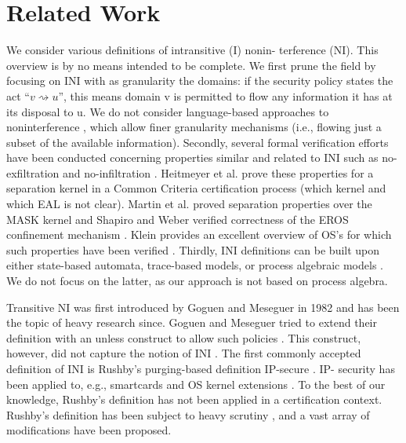 \documentclass[11pt,a4paper]{article}
\begin{document}
\section{Related Work}
We consider various definitions of intransitive (I) nonin- terference (NI). 
This overview is by no means intended to be complete. We first prune the field 
by focusing on INI with as granularity the domains: if the security policy states 
the act ``$v \rightsquigarrow u$'', this means domain v is permitted to flow any information it has 
at its disposal to u. We do not consider language-based approaches to noninterference
\cite{SKIPaper6}, which allow finer granularity mechanisms (i.e., flowing just a subset of 
the available information). Secondly, several formal verification efforts have 
been conducted concerning properties similar and related to INI such as 
no-exfiltration and no-infiltration \cite{SKIPaper7}. Heitmeyer et al. prove these properties 
for a separation kernel in a Common Criteria certification process \cite{Heitmeyer:2006:FSV:1180405.1180448} 
(which kernel and which EAL is not clear). Martin et al. proved separation 
properties over the MASK kernel \cite{Martin:2000:FCM:786768.786973} and Shapiro and Weber verified correctness 
of the EROS confinement mechanism \cite{Shapiro:2000:VEC:882494.884422}. Klein provides an excellent overview of 
OS’s for which such properties have been verified \cite{SKIPaper11}. Thirdly, INI definitions 
can be built upon either state-based automata, trace-based models, or process 
algebraic models \cite{SKIPaper12}. We do not focus on the latter, as our approach is not 
based on process algebra.

Transitive NI was first introduced by Goguen and Meseguer in 1982 \cite{SKIPaper13} and has 
been the topic of heavy research since. Goguen and Meseguer tried to 
extend their definition with an unless construct to allow such policies \cite{SKIPaper14}. 
This construct, however, did not capture the notion of INI \cite{SKIPaper15}. The first 
commonly accepted definition of INI is Rushby’s purging-based definition 
IP-secure \cite{rushby92}. IP- security has been applied to, e.g., smartcards \cite{SKIPaper16} and OS 
kernel extensions \cite{SKIPaper17}. To the best of our knowledge, Rushby’s definition has 
not been applied in a certification context. Rushby’s definition has been 
subject to heavy scrutiny \cite{SKIPaper18}, \cite{VanDerMeyden:2007:IIN:2393847.2393869} and a vast array of modifications have 
been proposed.
\end{document}
